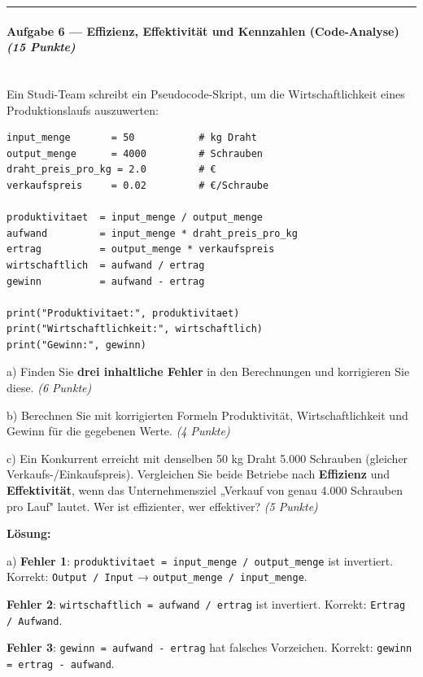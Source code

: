 \documentclass[11pt, a4paper]{article}
\begin{document}
\noindent\textcolor{rulegray}{\rule{\linewidth}{0.4pt}}


\paragraph{Aufgabe 6 — Effizienz, Effektivität und Kennzahlen (Code-Analyse) \textit{(15 Punkte)}}\mbox{}\\[2pt]

Ein Studi-Team schreibt ein Pseudocode-Skript, um die Wirtschaftlichkeit eines Produktionslaufs auszuwerten:


\begin{lstlisting}
input_menge       = 50           # kg Draht
output_menge      = 4000         # Schrauben
draht_preis_pro_kg = 2.0         # €
verkaufspreis     = 0.02         # €/Schraube

produktivitaet  = input_menge / output_menge
aufwand         = input_menge * draht_preis_pro_kg
ertrag          = output_menge * verkaufspreis
wirtschaftlich  = aufwand / ertrag
gewinn          = aufwand - ertrag

print("Produktivitaet:", produktivitaet)
print("Wirtschaftlichkeit:", wirtschaftlich)
print("Gewinn:", gewinn)
\end{lstlisting}


a) Finden Sie \textbf{drei inhaltliche Fehler} in den Berechnungen und korrigieren Sie diese. \textit{(6 Punkte)}


b) Berechnen Sie mit korrigierten Formeln Produktivität, Wirtschaftlichkeit und Gewinn für die gegebenen Werte. \textit{(4 Punkte)}


c) Ein Konkurrent erreicht mit denselben 50 kg Draht 5.000 Schrauben (gleicher Verkaufs-/Einkaufspreis). Vergleichen Sie beide Betriebe nach \textbf{Effizienz} und \textbf{Effektivität}, wenn das Unternehmensziel „Verkauf von genau 4.000 Schrauben pro Lauf" lautet. Wer ist effizienter, wer effektiver? \textit{(5 Punkte)}


\textbf{Lösung:}


a) \textbf{Fehler 1}: \texttt{produktivitaet = input\_menge / output\_menge} ist invertiert. Korrekt: \texttt{Output / Input} → \texttt{output\_menge / input\_menge}.

\textbf{Fehler 2}: \texttt{wirtschaftlich = aufwand / ertrag} ist invertiert. Korrekt: \texttt{Ertrag / Aufwand}.

\textbf{Fehler 3}: \texttt{gewinn = aufwand - ertrag} hat falsches Vorzeichen. Korrekt: \texttt{gewinn = ertrag - aufwand}.
\end{document}
